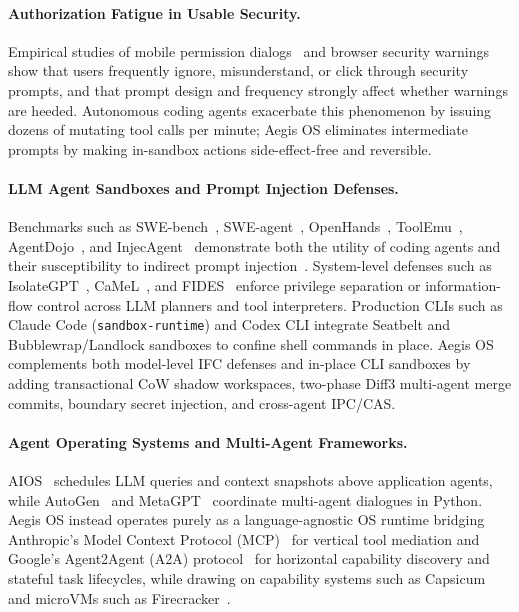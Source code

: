 \documentclass[acmsmall,screen,review]{acmart}
\begin{document}
\paragraph{Authorization Fatigue in Usable Security.} Empirical studies of mobile permission dialogs~\cite{felt2012android} and browser security warnings~\cite{akhawe2013alice} show that users frequently ignore, misunderstand, or click through security prompts, and that prompt design and frequency strongly affect whether warnings are heeded. Autonomous coding agents exacerbate this phenomenon by issuing dozens of mutating tool calls per minute; Aegis OS eliminates intermediate prompts by making in-sandbox actions side-effect-free and reversible.

\paragraph{LLM Agent Sandboxes and Prompt Injection Defenses.} Benchmarks such as SWE-bench~\cite{jimenez2024swebench}, SWE-agent~\cite{yang2024sweagent}, OpenHands~\cite{wang2025openhands}, ToolEmu~\cite{ruan2024toolemu}, AgentDojo~\cite{debenedetti2024agentdojo}, and InjecAgent~\cite{zhan2024injecagent} demonstrate both the utility of coding agents and their susceptibility to indirect prompt injection~\cite{greshake2023not}. System-level defenses such as IsolateGPT~\cite{wu2024secgpt}, CaMeL~\cite{debenedetti2025camel}, and FIDES~\cite{costa2025fides} enforce privilege separation or information-flow control across LLM planners and tool interpreters. Production CLIs such as Claude Code (\texttt{sandbox-runtime}) and Codex CLI integrate Seatbelt and Bubblewrap/Landlock sandboxes to confine shell commands in place. Aegis OS complements both model-level IFC defenses and in-place CLI sandboxes by adding transactional CoW shadow workspaces, two-phase Diff3 multi-agent merge commits, boundary secret injection, and cross-agent IPC/CAS.

\paragraph{Agent Operating Systems and Multi-Agent Frameworks.} AIOS~\cite{mei2024aios} schedules LLM queries and context snapshots above application agents, while AutoGen~\cite{wu2023autogen} and MetaGPT~\cite{hong2024metagpt} coordinate multi-agent dialogues in Python. Aegis OS instead operates purely as a language-agnostic OS runtime bridging Anthropic's Model Context Protocol (MCP)~\cite{anthropic2024mcp} for vertical tool mediation and Google's Agent2Agent (A2A) protocol~\cite{google2025a2a} for horizontal capability discovery and stateful task lifecycles, while drawing on capability systems such as Capsicum~\cite{watson2010capsicum} and microVMs such as Firecracker~\cite{agache2020firecracker}.
\end{document}
